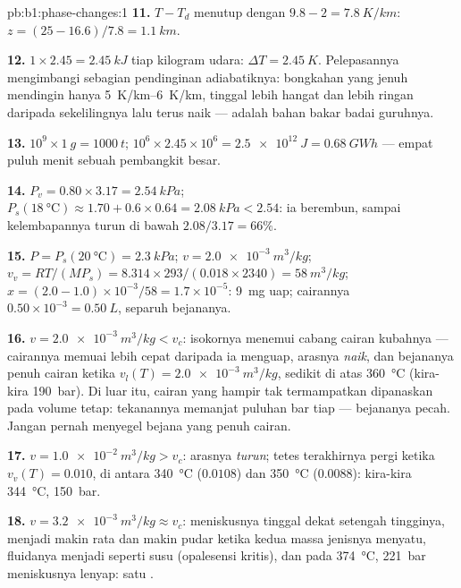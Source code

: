 \begin{solution}{pb:b1:phase-changes:1}
\textbf{11.} $T - T_d$ menutup dengan $9.8 - 2 = \qty{7.8}{K/km}$: $z = (25 - 16.6)/
7.8 = \qty{1.1}{km}$.

\textbf{12.} $1 \times 2.45 = \qty{2.45}{kJ}$ tiap kilogram udara: $\Delta T =
\qty{2.45}{K}$. Pelepasannya mengimbangi sebagian pendinginan adiabatiknya: bongkahan
yang jenuh mendingin hanya \qtyrange{5}{6}{K/km}, tinggal lebih hangat dan
lebih ringan daripada sekelilingnya lalu terus naik ---  adalah
bahan bakar badai guruhnya.

\textbf{13.} $10^9 \times \qty{1}{g} = \qty{1000}{t}$; $10^6 \times 2.45 \times 10^6 =
\qty{2.5e12}{J} = \qty{0.68}{GW h}$ --- empat puluh menit sebuah pembangkit besar.

\textbf{14.} $P_v = 0.80 \times 3.17 = \qty{2.54}{kPa}$; $P_s(\qty{18}{\degreeCelsius})
\approx 1.70 + 0.6 \times 0.64 = \qty{2.08}{kPa} < 2.54$: ia berembun, sampai
kelembapannya turun di bawah $2.08/3.17 = 66\%$.

\textbf{15.} $P = P_s(\qty{20}{\degreeCelsius}) = \qty{2.3}{kPa}$; $v = \qty{2.0e-3}{m^3/kg}$;
$v_v = RT/(MP_s) = 8.314 \times 293/(0.018 \times 2340) = \qty{58}{m^3/kg}$; $x =
(2.0 - 1.0) \times 10^{-3}/58 = 1.7 \times 10^{-5}$: \qty{9}{mg} uap;
cairannya $0.50 \times 10^{-3} = \qty{0.50}{L}$, separuh bejananya.

\textbf{16.} $v = \qty{2.0e-3}{m^3/kg} < v_c$: isokornya menemui cabang
cairan kubahnya --- cairannya memuai lebih cepat daripada ia menguap, arasnya
\emph{naik}, dan bejananya penuh cairan ketika $v_l(T) =
\qty{2.0e-3}{m^3/kg}$, sedikit di atas \qty{360}{\degreeCelsius} (kira-kira
\qty{190}{bar}). Di luar itu, cairan yang hampir tak termampatkan dipanaskan pada volume
tetap: tekanannya memanjat puluhan bar tiap  --- bejananya
pecah. Jangan pernah menyegel bejana yang penuh cairan.

\textbf{17.} $v = \qty{1.0e-2}{m^3/kg} > v_c$: arasnya \emph{turun}; tetes
terakhirnya pergi ketika $v_v(T) = 0.010$, di antara \qty{340}{\degreeCelsius} ($0.0108$)
dan \qty{350}{\degreeCelsius} ($0.0088$): kira-kira \qty{344}{\degreeCelsius},
\qty{150}{bar}.

\textbf{18.} $v = \qty{3.2e-3}{m^3/kg} \approx v_c$: meniskusnya tinggal dekat
setengah tingginya, menjadi makin rata dan makin pudar ketika kedua massa jenisnya menyatu,
fluidanya menjadi seperti susu (opalesensi kritis), dan pada \qty{374}{\degreeCelsius},
\qty{221}{bar} meniskusnya lenyap: satu .


\end{solution}
